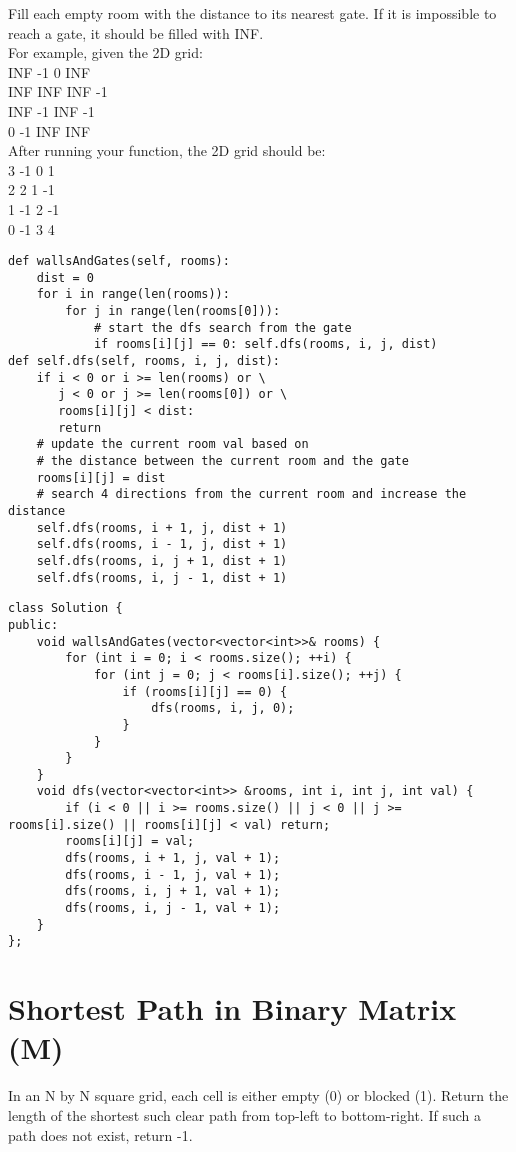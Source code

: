 Fill each empty room with the distance to its nearest gate. If it is impossible to reach a gate, it should be filled with INF.\\

For example, given the 2D grid:\\
INF  -1  0  INF\\
INF INF INF  -1\\
INF  -1 INF  -1\\
  0  -1 INF INF\\

After running your function, the 2D grid should be:\\
  3  -1   0   1\\
  2   2   1  -1\\
  1  -1   2  -1\\
  0  -1   3   4\\

\begin{lstlisting}
def wallsAndGates(self, rooms):
	dist = 0
	for i in range(len(rooms)):
		for j in range(len(rooms[0])):
			# start the dfs search from the gate
			if rooms[i][j] == 0: self.dfs(rooms, i, j, dist)
def self.dfs(self, rooms, i, j, dist):
	if i < 0 or i >= len(rooms) or \
	   j < 0 or j >= len(rooms[0]) or \
	   rooms[i][j] < dist:
	   return
	# update the current room val based on 
	# the distance between the current room and the gate
	rooms[i][j] = dist 
	# search 4 directions from the current room and increase the distance
	self.dfs(rooms, i + 1, j, dist + 1)
	self.dfs(rooms, i - 1, j, dist + 1)
	self.dfs(rooms, i, j + 1, dist + 1)
	self.dfs(rooms, i, j - 1, dist + 1)
\end{lstlisting}

\begin{lstlisting}
class Solution {
public:
    void wallsAndGates(vector<vector<int>>& rooms) {
        for (int i = 0; i < rooms.size(); ++i) {
            for (int j = 0; j < rooms[i].size(); ++j) {
                if (rooms[i][j] == 0) {
                    dfs(rooms, i, j, 0);
                }
            }
        }
    }
    void dfs(vector<vector<int>> &rooms, int i, int j, int val) {
        if (i < 0 || i >= rooms.size() || j < 0 || j >= rooms[i].size() || rooms[i][j] < val) return;
        rooms[i][j] = val;
        dfs(rooms, i + 1, j, val + 1);
        dfs(rooms, i - 1, j, val + 1);
        dfs(rooms, i, j + 1, val + 1);
        dfs(rooms, i, j - 1, val + 1);
    }
};
\end{lstlisting}

\section{Shortest Path in Binary Matrix (M)}
In an N by N square grid, each cell is either empty (0) or blocked (1). Return the length of the shortest such clear path from top-left to bottom-right.  If such a path does not exist, return -1.\\

